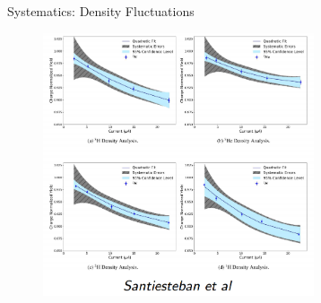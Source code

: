 \documentclass{beamer}
\begin{document}
\begin{frame}{Systematics: Density Fluctuations}
	\vspace{-15pt}
	\begin{block}{}
	\begin{figure}
		\includegraphics[width=8cm]{../images/density_cor.png}
	\end{figure}
	\end{block}
\end{frame}
\end{document}
